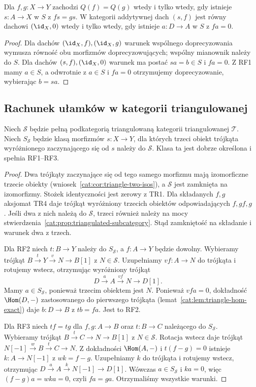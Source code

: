 \begin{wniosek}\label{cat:cor:roof-equality}
Dla $f,g:X\to Y$ zachodzi $Q(f)=Q(g)$ wtedy i tylko wtedy, gdy istnieje $s:A\to X$ w $S$ z $fs=gs$. W kategorii addytywnej dach $(s,f)$ jest równy dachowi $(\id_X,0)$ wtedy i tylko wtedy, gdy istnieje $a:D\to A$ w $S$ z $fa=0$.
\end{wniosek}
\begin{proof}
Dla dachów $(\id_X,f),(\id_X,g)$ warunek wspólnego doprecyzowania wymusza równość obu morfizmów doprecyzowujących; wspólny mianownik należy do $S$. Dla dachów $(s,f),(\id_X,0)$ warunek ma postać $sa=b\in S$ i $fa=0$. Z RF1 mamy $a\in S$, a odwrotnie z $a\in S$ i $fa=0$ otrzymujemy doprecyzowanie, wybierając $b=sa$.
\end{proof}

\subsection{Rachunek ułamków w kategorii triangulowanej}
\begin{twierdzenie}\label{cat:thm:verdier-fractions}
Niech $\mathcal S$ będzie pełną podkategorią triangulowaną kategorii triangulowanej $\mathcal T$. Niech $S_{\mathcal S}$ będzie klasą morfizmów $s:X\to Y$, dla których trzeci obiekt trójkąta wyróżnionego zaczynającego się od $s$ należy do $\mathcal S$. Klasa ta jest dobrze określona i spełnia RF1--RF3.
\end{twierdzenie}
\begin{proof}
Dwa trójkąty zaczynające się od tego samego morfizmu mają izomorficzne trzecie obiekty (wniosek~\ref{cat:cor:triangle-two-isos}), a $\mathcal S$ jest zamknięta na izomorfizmy. Stożek identyczności jest zerowy z TR1. Dla składanych $f,g$ aksjomat TR4 daje trójkąt wyróżniony trzecich obiektów odpowiadających $f,gf,g$. Jeśli dwa z nich należą do $\mathcal S$, trzeci również należy na mocy stwierdzenia~\ref{cat:prop:triangulated-subcategory}. Stąd zamkniętość na składanie i warunek dwa z trzech.

Dla RF2 niech $t:B\to Y$ należy do $S_{\mathcal S}$, a $f:A\to Y$ będzie dowolny. Wybieramy trójkąt $B\xrightarrow t Y\xrightarrow v N\to B[1]$ z $N\in\mathcal S$. Uzupełniamy $vf:A\to N$ do trójkąta i rotujemy wstecz, otrzymując wyróżniony trójkąt
\[
 D\xrightarrow a A\xrightarrow{vf}N\to D[1].
\]
Mamy $a\in S_{\mathcal S}$, ponieważ trzecim obiektem jest $N$. Ponieważ $vfa=0$, dokładność $\Hom(D,-)$ zastosowanego do pierwszego trójkąta (lemat~\ref{cat:lem:triangle-hom-exact}) daje $b:D\to B$ z $tb=fa$. Jest to RF2.

Dla RF3 niech $tf=tg$ dla $f,g:A\to B$ oraz $t:B\to C$ należącego do $S_{\mathcal S}$. Wybieramy trójkąt $B\xrightarrow t C\to N\to B[1]$ z $N\in\mathcal S$. Rotacja wstecz daje trójkąt $N[-1]\xrightarrow w B\xrightarrow t C\to N$. Z dokładności $\Hom(A,-)$ i $t(f-g)=0$ istnieje $k:A\to N[-1]$ z $wk=f-g$. Uzupełniamy $k$ do trójkąta i rotujemy wstecz, otrzymując $D\xrightarrow a A\xrightarrow k N[-1]\to D[1]$. Wówczas $a\in S_{\mathcal S}$ i $ka=0$, więc $(f-g)a=wka=0$, czyli $fa=ga$. Otrzymaliśmy wszystkie warunki.
\end{proof}

